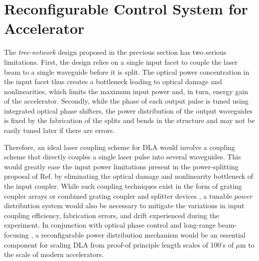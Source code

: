 \section{Reconfigurable Control System for Accelerator}

The \textit{tree-network} design proposed in the previous section has two serious limitations.  First, the design relies on a single input facet to couple the laser beam to a single waveguide before it is split.  The optical power concentration in the input facet thus creates a bottleneck leading to optical damage and nonlinearities, which limits the maximum input power and, in turn, energy gain of the accelerator.  Secondly, while the phase of each output pulse is tuned using integrated optical phase shifters, the power distribution of the output waveguides is fixed by the fabrication of the splits and bends in the structure and may not be easily tuned later if there are errors.

Therefore, an ideal laser coupling scheme for DLA would involve a coupling scheme that directly couples a single laser pulse into several waveguides.  This would greatly ease the input power limitations present in the power-splitting proposal of Ref. \cite{hughes_-chip_2018} by eliminating the optical damage and nonlinearity bottleneck of the input coupler.  While such coupling techniques exist in the form of grating coupler arrays \cite{van2011optical} or combined grating coupler and splitter devices \cite{spuesens2016grating}, a tunable $\textit{power}$ distribution system would also be necessary to mitigate the variations in input coupling efficiency, fabrication errors, and drift experienced during the experiment.  In conjunction with optical phase control and long-range beam-focusing \cite{niedermayer_alternating_2018}, a reconfigurable power distribution mechanism would be an essential component for scaling DLA from proof-of principle length scales of 100's of $\mu$m to the scale of modern accelerators.

